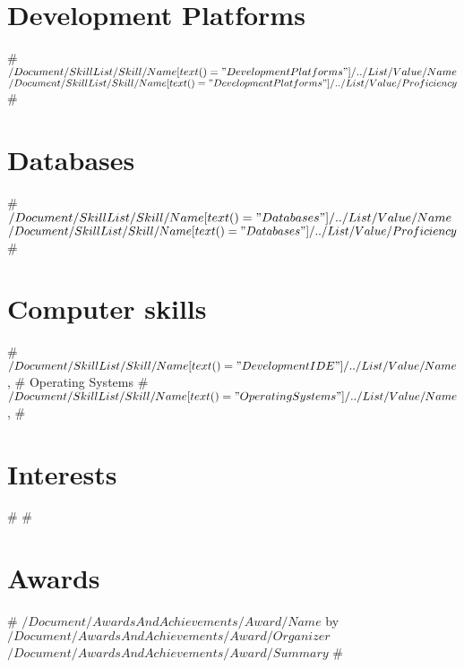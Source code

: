 \documentclass[11pt,a4paper,sans]{moderncv}
\begin{document}
\section{Development Platforms}
#
{$/Document/SkillList/Skill/Name[text()="Development Platforms"]/../List/Value/Name$}
{$/Document/SkillList/Skill/Name[text()="Development Platforms"]/../List/Value/Proficiency$}
#

\section{Databases}
#
{$/Document/SkillList/Skill/Name[text()="Databases"]/../List/Value/Name$}
{$/Document/SkillList/Skill/Name[text()="Databases"]/../List/Value/Proficiency$}
#

\section{Computer skills}
{#$/Document/SkillList/Skill/Name[text()="Development IDE"]/../List/Value/Name$, #}
{Operating Systems}
{#$/Document/SkillList/Skill/Name[text()="Operating Systems"]/../List/Value/Name$, #}


\section{Interests}
#
#

\section{Awards}
#
{$/Document/AwardsAndAchievements/Award/Name$ by $/Document/AwardsAndAchievements/Award/Organizer$}
{$/Document/AwardsAndAchievements/Award/Summary$}
#



\end{document}
